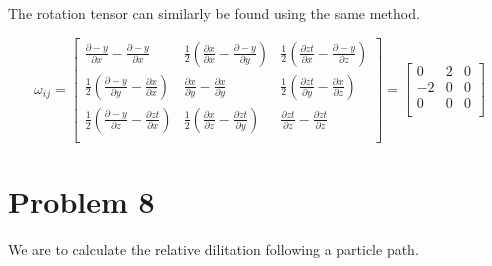 \documentclass[11pt,a4paper,english]{article}
\numberwithin{equation}{section}
\begin{document}
The rotation tensor can similarly be found using the same method.     
     
     \[\omega_{ij}=
\begin{bmatrix}
       \frac{\partial -y}{\partial x} - \frac{\partial -y}{\partial x} & 
       \frac{1}{2}(\frac{\partial x}{\partial x} - \frac{\partial -y}{\partial y}) & 
       \frac{1}{2}(\frac{\partial zt}{\partial x} - \frac{\partial -y}{\partial z}) \\[0.3em]
       
       \frac{1}{2}(\frac{\partial -y}{\partial y} - \frac{\partial x}{\partial x}) & 
       \frac{\partial x}{\partial y} - \frac{\partial x}{\partial y} & 
       \frac{1}{2}(\frac{\partial zt}{\partial y} - \frac{\partial x}{\partial z}) \\[0.3em]
      
       \frac{1}{2}(\frac{\partial -y}{\partial z} - \frac{\partial zt}{\partial x}) & 
       \frac{1}{2}(\frac{\partial x}{\partial z} - \frac{\partial zt}{\partial y}) & 
       \frac{\partial zt}{\partial z} - \frac{\partial zt}{\partial z} \\[0.3em]
     \end{bmatrix}
     =\begin{bmatrix}
       0 & 
       2 & 
       0\\[0.3em]
       
       -2 & 
       0 & 
       0\\[0.3em]
       
       0 & 
       0 & 
       0\\[0.3em]
     \end{bmatrix}\]

\section{Problem 8}
We are to calculate the relative dilitation following a particle path.
\end{document}
